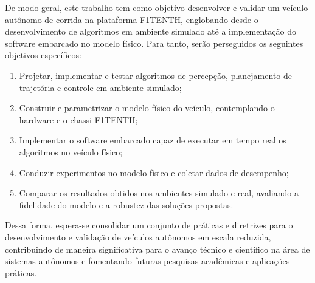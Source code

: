 De modo geral, este trabalho tem como objetivo desenvolver e validar um veículo
autônomo de corrida na plataforma F1TENTH, englobando desde o desenvolvimento
de algoritmos em ambiente simulado até a implementação do software embarcado no
modelo físico. Para tanto, serão perseguidos os seguintes objetivos
específicos:
\begin{enumerate}
    \item Projetar, implementar e testar algoritmos de percepção, planejamento de
          trajetória e controle em ambiente simulado;
    \item Construir e parametrizar o modelo físico do veículo, contemplando o hardware e
          o chassi F1TENTH;
    \item Implementar o software embarcado capaz de executar em tempo real os algoritmos
          no veículo físico;
    \item Conduzir experimentos no modelo físico e coletar dados de desempenho;
    \item Comparar os resultados obtidos nos ambientes simulado e real, avaliando a
          fidelidade do modelo e a robustez das soluções propostas.
\end{enumerate}

Dessa forma, espera-se consolidar um conjunto de práticas e diretrizes para o
desenvolvimento e validação de veículos autônomos em escala reduzida,
contribuindo de maneira significativa para o avanço técnico e científico na
área de sistemas autônomos e fomentando futuras pesquisas acadêmicas e
aplicações práticas.

